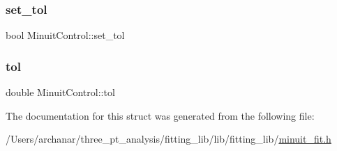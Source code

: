 \mbox{\label{structMinuitControl_a7270f6be2535a86090d41cb1bbcc0640}} 
\subsubsection{\texorpdfstring{set\_tol}{set\_tol}}
{\footnotesize\ttfamily bool Minuit\+Control\+::set\+\_\+tol}

\mbox{\label{structMinuitControl_a796723b11058849217e25bac3937f34d}} 
\subsubsection{\texorpdfstring{tol}{tol}}
{\footnotesize\ttfamily double Minuit\+Control\+::tol}



The documentation for this struct was generated from the following file\+:\begin{DoxyCompactItemize}
\item 
/\+Users/archanar/three\+\_\+pt\+\_\+analysis/fitting\+\_\+lib/lib/fitting\+\_\+lib/\mbox{\hyperlink{lib_2fitting__lib_2minuit__fit_8h}{minuit\+\_\+fit.\+h}}\end{DoxyCompactItemize}
